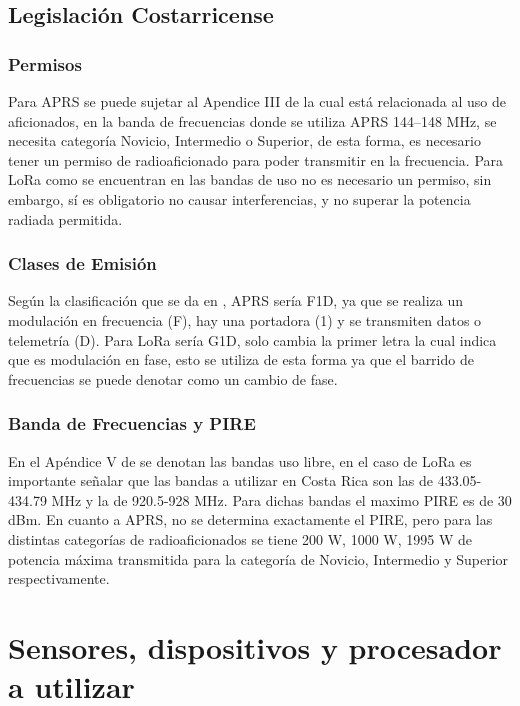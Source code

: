 \documentclass[journal]{IEEEtran}
\begin{document}
\subsection{Legislación Costarricense}

\subsubsection{Permisos}

Para APRS se puede sujetar al Apendice III de \cite{micitt_pnaf_2023}  la cual está relacionada al uso de aficionados, en la banda de frecuencias donde se utiliza APRS 144--148 MHz, se necesita categoría Novicio, Intermedio o Superior, de esta forma, es necesario tener un permiso de radioaficionado para poder transmitir en la frecuencia.  \cite{sutel_manual_radioaficionados_2014} Para LoRa como se encuentran en las bandas de uso no es necesario un permiso, sin embargo, sí es obligatorio no causar interferencias,  y no superar la potencia radiada permitida. 

\subsubsection{Clases de Emisión}

Según la clasificación que se da en \cite{comreg0834}, APRS sería F1D, ya que se realiza un modulación en frecuencia (F), hay una portadora (1) y se transmiten datos o telemetría (D). Para LoRa sería G1D, solo cambia la primer letra la cual indica que es modulación en fase, esto se utiliza de esta forma ya que el barrido de frecuencias se puede denotar como un cambio de fase.

\subsubsection{Banda de Frecuencias y PIRE}

En el Apéndice V de \cite{micitt_pnaf_2023} se denotan las bandas uso libre, en el caso de LoRa es importante señalar que las bandas a utilizar en Costa Rica son las de 433.05-434.79 MHz y la de 920.5-928 MHz. \cite{lora_rp002-1.0.3_2021} Para dichas bandas el maximo PIRE es de 30 dBm. En cuanto a APRS, no se determina exactamente el PIRE, pero para las distintas categorías de radioaficionados se tiene 200 W, 1000 W, 1995 W de potencia máxima transmitida para la categoría de Novicio, Intermedio y Superior respectivamente.

\section{Sensores, dispositivos y procesador a utilizar}
\end{document}
